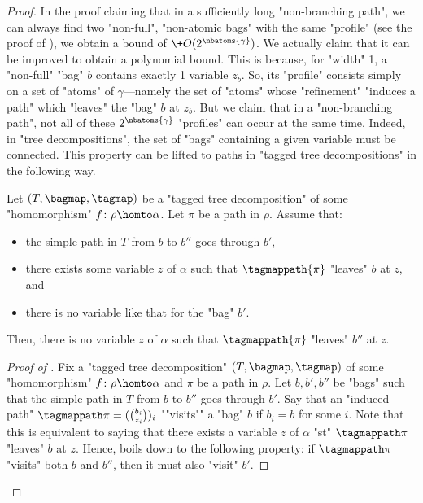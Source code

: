 \begin{proof}
	\medskip

	 In the proof claiming that in a sufficiently
	long "non-branching path", we can always find two "non-full", "non-atomic bags" with the same 
	"profile" (see the proof of ), we obtain a bound of
	$\+O(2^{\nbatoms{\gamma}})$. We actually claim that it can be improved to obtain a polynomial 
	bound. This is because, for "width" 1, a "non-full" "bag" $b$ contains exactly 1 variable $z_b$.
	So, its "profile" consists  
	simply on a set of "atoms" of $\gamma$---namely the set of "atoms" whose "refinement" "induces a 
	path" which "leaves" the "bag" $b$ at $z_b$.
	But we claim that in a "non-branching path", not all of these $2^{\nbatoms{\gamma}}$
	"profiles" can occur at the same time. Indeed,
	in "tree decompositions", the set of "bags" containing a given variable must be connected.
	This property can be lifted to paths in "tagged tree decompositions" in the following way.
	\begin{fact}
		\AP\label{fact:paths-are-connected}
		Let $(T, \bagmap, \tagmap)$ be a "tagged tree decomposition"
		of some "homomorphism" $f\colon \rho \homto \alpha$.
		Let $\pi$ be a path in $\rho$. Assume that:
		\begin{itemize}
			\item the simple path in $T$ from $b$ to $b''$ goes through $b'$,
			\item there exists some variable $z$ of $\alpha$ such that $\tagmappath{\pi}$ 
			  	"leaves" $b$ at $z$, and
			\item there is no variable like that for the "bag" $b'$.
		\end{itemize}
		Then, there is no variable $z$ of $\alpha$ such that
		$\tagmappath{\pi}$ "leaves" $b''$ at $z$.
	\end{fact}
	\begin{proof}[Proof of ]
		Fix a "tagged tree decomposition" $(T, \bagmap, \tagmap)$ of some "homomorphism" $f\colon \rho \homto \alpha$ and $\pi$ be a path in $\rho$. Let $b,b',b''$ be "bags" such that
		the simple path in $T$ from $b$ to $b''$ goes through $b'$.
		\AP Say that an "induced path" $\tagmappath\pi = ({b_i \choose z_i})_i$ ""visits"" a "bag" $b$
		if $b_i = b$ for some $i$. Note that this is equivalent to saying that there exists a variable
		$z$ of $\alpha$ "st" $\tagmappath\pi$ "leaves" $b$ at $z$.
		Hence,  boils down to the following property:
		if $\tagmappath\pi$ "visits" both $b$ and $b''$, then it must also "visit" $b'$.

\end{proof}
\end{proof}
